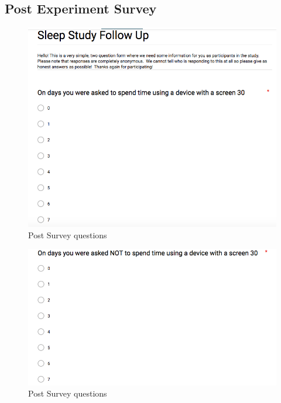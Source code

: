 \documentclass[12pt,]{article}
\begin{document}
\hypertarget{post-experiment-survey}{%
\subsection{Post Experiment Survey}\label{post-experiment-survey}}

\begin{figure}[H]

{\centering \includegraphics[width=0.7\linewidth]{img/post_followup_1} 

}

\caption{Post Survey questions}\label{fig:unnamed-chunk-13}
\end{figure}
\begin{figure}[H]

{\centering \includegraphics[width=0.7\linewidth]{img/post_followup_2} 

}

\caption{Post Survey questions}\label{fig:unnamed-chunk-13}
\end{figure}
\end{document}
